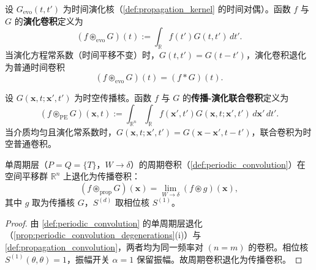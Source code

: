 \begin{definition}[演化卷积]\label{def:evolution_convolution}
设 $G_{\text{evo}}(t,t')$ 为时间演化核（\cref{def:propagation_kernel} 的时间对偶）。函数 $f$ 与 $G$ 的\textbf{演化卷积}定义为
\[
(f \circledast_{\text{evo}} G)(t) := \int_{\mathbb{R}}f(t')G(t,t')\,dt'.
\]
当演化方程常系数（时间平移不变）时，$G(t,t') = G(t-t')$，演化卷积退化为普通时间卷积
\[
(f \circledast_{\text{evo}} G)(t) = (f * G)(t).
\]
\end{definition}

\begin{definition}[传播-演化联合卷积]\label{def:joint_convolution}
设 $G(\mathbf{x},t;\mathbf{x}',t')$ 为时空传播核。函数 $f$ 与 $G$ 的\textbf{传播-演化联合卷积}定义为
\[
(f \circledast_{\text{PE}} G)(\mathbf{x},t) := \int_{\mathbb{R}^n}\int_{\mathbb{R}}f(\mathbf{x}',t')G(\mathbf{x},t;\mathbf{x}',t')\,d\mathbf{x}'\,dt'.
\]
当介质均匀且演化常系数时，$G(\mathbf{x},t;\mathbf{x}',t') = G(\mathbf{x}-\mathbf{x}', t-t')$，联合卷积为时空普通卷积。
\end{definition}

\begin{theorem}[传播卷积与周期卷积的关系]\label{thm:propagation_periodic_convolution}
单周期层（$P=Q=\{T\}$，$W\to\delta$）的周期卷积（\cref{def:periodic_convolution}）在空间平移群 $\mathbb{R}^n$ 上退化为传播卷积：
\[
(f \circledast_{\text{prop}} G)(\mathbf{x}) = \lim_{W\to\delta}(f\circledast g)(\mathbf{x}),
\]
其中 $g$ 取为传播核 $G$，$S^{(d)}$ 取相位核 $S^{(1)}$。
\end{theorem}

\begin{proof}
由 \cref{def:periodic_convolution} 的单周期层退化（\cref{prop:periodic_convolution_degenerations}(i)）与 \cref{def:propagation_convolution}，两者均为同一频率对 $(n=m)$ 的卷积。相位核 $S^{(1)}(\theta,\theta)=1$，振幅开关 $\alpha=1$ 保留振幅。故周期卷积退化为传播卷积。
\end{proof}

